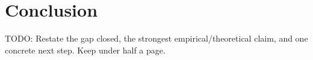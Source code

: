 \section{Conclusion}
\label{sec:conclusion}

TODO: Restate the gap closed, the strongest empirical/theoretical claim, and
one concrete next step. Keep under half a page.
